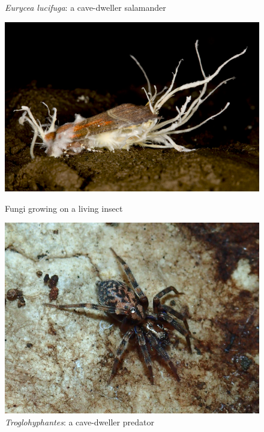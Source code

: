 \documentclass[draft, final]{report}
\begin{document}
\begin{figure}[!ht]
\begin{minipage}[c]{.46\linewidth}
        \caption{\emph{Eurycea lucifuga}: a cave-dweller salamander\cite{cavesalamander}}
    \end{minipage}
    \hfill%
    \begin{minipage}[c]{.46\linewidth}
        \centering
        \includegraphics[scale=0.35]{LateX/Images/cavefungi.png}
        \caption{Fungi growing on a living insect\cite{cavesfungi}}
    \end{minipage}
    \hfill%
    \begin{minipage}[c]{.46\linewidth}
        \centering
        \includegraphics[scale=0.15]{LateX/Images/cavespider.png}
        \caption{\emph{Troglohyphantes}: a cave-dweller predator\cite{cavespider}}
    \end{minipage}
  \end{figure}
\end{document}
